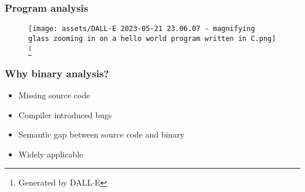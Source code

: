 \begin{frame}

    \frametitle{Program analysis}
    \begin{figure}
    \texttt{[image: assets/DALL·E 2023-05-21 23.06.07 - magnifying glass zooming in on a hello world program written in C.png]}
    \footnote{\tiny Generated by DALL$\cdot$E}
    \end{figure}
\end{frame}

\begin{frame}

    \frametitle{Why binary analysis?}
    \begin{itemize}
        \item Missing source code
        \item Compiler introduced bugs
        \item Semantic gap between source code and binary
        \item Widely applicable
    \end{itemize}
\end{frame}
